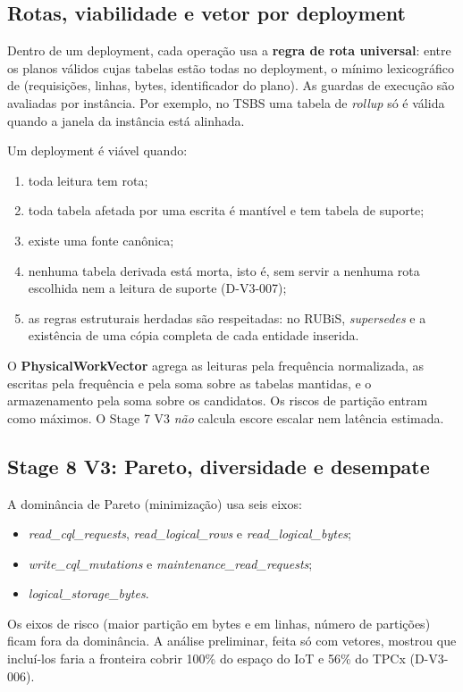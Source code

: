 \documentclass[10pt,a4paper,twoside]{article}
\theoremstyle{definition}\newtheorem{definicao}{Definição}
\begin{document}
\subsection{Rotas, viabilidade e vetor por deployment}
Dentro de um deployment, cada operação usa a \textbf{regra de rota universal}: entre os planos válidos cujas tabelas
estão todas no deployment, o mínimo lexicográfico de (requisições, linhas, bytes, identificador do plano). As guardas de
execução são avaliadas por instância. Por exemplo, no TSBS uma tabela de \emph{rollup} só é válida quando a janela da
instância está alinhada.

Um deployment é viável quando:
\begin{enumerate}
\item toda leitura tem rota;
\item toda tabela afetada por uma escrita é mantível e tem tabela de suporte;
\item existe uma fonte canônica;
\item nenhuma tabela derivada está morta, isto é, sem servir a nenhuma rota escolhida nem a leitura de suporte (D-V3-007);
\item as regras estruturais herdadas são respeitadas: no RUBiS, \emph{supersedes} e a existência de uma cópia completa de cada entidade inserida.
\end{enumerate}

O \textbf{PhysicalWorkVector} agrega as leituras pela frequência normalizada, as escritas pela frequência e pela soma
sobre as tabelas mantidas, e o armazenamento pela soma sobre os candidatos. Os riscos de partição entram como máximos.
O Stage 7 V3 \emph{não} calcula escore escalar nem latência estimada.

\subsection{Stage 8 V3: Pareto, diversidade e desempate}
A dominância de Pareto (minimização) usa seis eixos:
\begin{itemize}
\item \emph{read\_cql\_requests}, \emph{read\_logical\_rows} e \emph{read\_logical\_bytes};
\item \emph{write\_cql\_mutations} e \emph{maintenance\_read\_requests};
\item \emph{logical\_storage\_bytes}.
\end{itemize}
Os eixos de risco (maior partição em bytes e em linhas, número de partições) ficam fora da dominância. A análise
preliminar, feita só com vetores, mostrou que incluí-los faria a fronteira cobrir 100\% do espaço do IoT e 56\% do TPCx
(D-V3-006).
\end{document}
